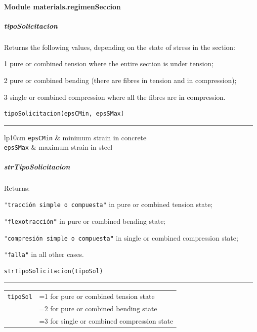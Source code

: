 \paragraph{Module materials.regimenSeccion}
\subparagraph{tipoSolicitacion}
\noindent Returns the following values, depending on the state of stress in the section:
\begin{description}
\item{1} pure or combined tension where the entire section is under tension;
\item{2} pure or combined bending (there are fibres in tension and in compression);
\item{3} single or combined compression where all the fibres are in compression.
\end{description}
\begin{verbatim}
tipoSolicitacion(epsCMin, epsSMax)
\end{verbatim}
\vspace{-10pt}
{\color{grayLines} \rule{\linewidth}{0.25pt}}
\begin{center}
\begin{tabular}{lp{10cm}}
{\tt epsCMin} & minimum strain in concrete \\
{\tt epsSMax} & maximum strain in steel \\
\end{tabular}
\end{center}

\subparagraph{strTipoSolicitacion}
\noindent Returns:
\begin{description}
\item{\verb|"tracción simple o compuesta"|} in pure or combined tension state;
\item{\verb|"flexotracción"|} in pure or combined bending state;
\item{\verb|"compresión simple o compuesta"|} in single or combined compression state;
\item{\verb|"falla"|} in all other cases.
\end{description}
\begin{verbatim}
strTipoSolicitacion(tipoSol)
\end{verbatim}
\vspace{-10pt}
{\color{grayLines} \rule{\linewidth}{0.25pt}}
\begin{center}
\begin{tabular}{lp{10cm}}
{\tt tipoSol} & =1 for pure or combined tension state \\
& =2 for pure or combined bending state \\
& =3 for single or combined compression state \\
\end{tabular}
\end{center}

